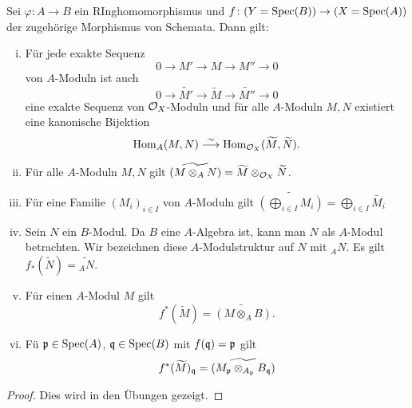 \begin{prop}
\label{prop:9.3}
Sei $\varphi\colon A \to B$ ein RInghomomorphismus und $f \colon (Y = \operatorname{Spec}(B)) \to (X = \operatorname{Spec}(A))$ der zugehörige Morphismus von Schemata. Dann gilt:
	\begin{enumerate}[i)]
		\item Für jede exakte Sequenz
		\[
			0 \to M' \to M \to M'' \to 0
		\]
		von $A$-Moduln ist auch
		\[
			0 \to \widetilde{M'} \to \widetilde{M} \to \widetilde{M''} \to 0
		\]
		eine exakte Sequenz von $\mathcal{O}_X$-Moduln und für alle $A$-Moduln $M,N$ existiert eine kanonische Bijektion
		\[
			\operatorname{Hom}_A(M,N) \overset{\sim}{\longrightarrow} \operatorname{Hom}_{\mathcal{O}_X}(\widetilde{M},\widetilde{N}).
		\]
		\item Für alle $A$-Moduln $M,N$ gilt $\widetilde{(M\otimes_A N)} = \widetilde{M} \otimes_{\mathcal{O}_X} \widetilde{N}$.
		\item Für eine Familie $(M_i)_{i\in I}$ von $A$-Moduln gilt $\widetilde{(\bigoplus_{i\in I}M_i)} = \bigoplus_{i\in I} \widetilde{M_i}$
		\item Sein $N$ ein $B$-Modul. Da $B$ eine $A$-Algebra ist, kann man $N$ als $A$-Modul betrachten. Wir bezeichnen diese $A$-Modulstruktur auf $N$ mit $_{A}N$. Es gilt $f_*(\widetilde{N}) = \widetilde{_{A}N}$.
		\item Für einen $A$-Modul $M$ gilt
		\[
			f^*(\widetilde{M}) = \widetilde{(M \otimes_A B)}.
		\]
		\item Fü $\mathfrak{p} \in \operatorname{Spec}(A)$, $\mathfrak{q} \in \operatorname{Spec}(B)$ mit $f(\mathfrak{q}) = \mathfrak{p}$ gilt
		\[
			f^*(\widetilde{M})_{\mathfrak{q}} = \widetilde{(M_{\mathfrak{p}} \otimes_{A_{\mathfrak{p}}} B_{\mathfrak{q}})}
		\]
	\end{enumerate}
	\begin{proof}
		Dies wird in den Übungen gezeigt.
	\end{proof}
\end{prop}

